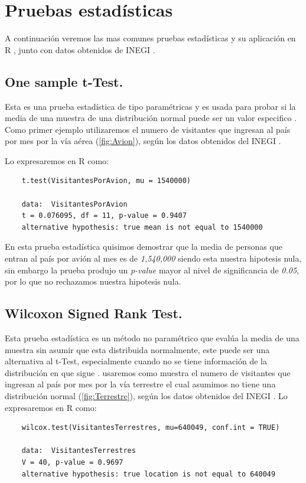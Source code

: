 \documentclass[]{article}
\begin{document}
\section{Pruebas estadísticas}
A continuación veremos las mas comunes pruebas estadísticas \cite{Articulo_0} y su aplicación en R         \cite{rproject}, junto con datos obtenidos de INEGI \cite{inegi}.
\subsection{One sample t-Test.}
Esta es una prueba estadística de tipo paramétricas y es usada para probar si la media de una muestra de una distribución normal puede ser un valor especifico \cite{Articulo_0}.
Como primer ejemplo utilizaremos el numero de visitantes que ingresan al país por mes por la vía aérea (\autoref{fig:Avion}), según los datos obtenidos del INEGI \cite{inegi}.

Lo expresaremos en R como:
  \begin{lstlisting}
	t.test(VisitantesPorAvion, mu = 1540000)
	
	data:  VisitantesPorAvion
	t = 0.076095, df = 11, p-value = 0.9407
	alternative hypothesis: true mean is not equal to 1540000
   \end{lstlisting}
   
   En esta prueba estadística quisimos demostrar que la media de personas que entran al país por avión al mes es de \textit{1,540,000} siendo esta nuestra hipotesis nula, sin embargo la prueba produjo un \textit{p-value} mayor al nivel de significancia de \textit{0.05}, por lo que no rechazamos nuestra hipotesis nula.

\subsection{Wilcoxon Signed Rank Test.}
Esta prueba estadística es un método no paramétrico que evalúa la media de una muestra sin asumir que esta distribuida normalmente, este puede ser una alternativa al t-Test, especialmente cuando no se tiene información de la distribución en que sigue \cite{Articulo_0}.
usaremos como muestra el numero de visitantes que ingresan al país por mes por la vía terrestre el cual asumimos no tiene una distribución normal (\autoref{fig:Terrestre}), según los datos obtenidos del INEGI \cite{inegi}.
Lo expresaremos en R como:
  \begin{lstlisting}
	wilcox.test(VisitantesTerrestres, mu=640049, conf.int = TRUE)
	
	data:  VisitantesTerrestres
	V = 40, p-value = 0.9697
	alternative hypothesis: true location is not equal to 640049
   \end{lstlisting}
   
\end{document}
